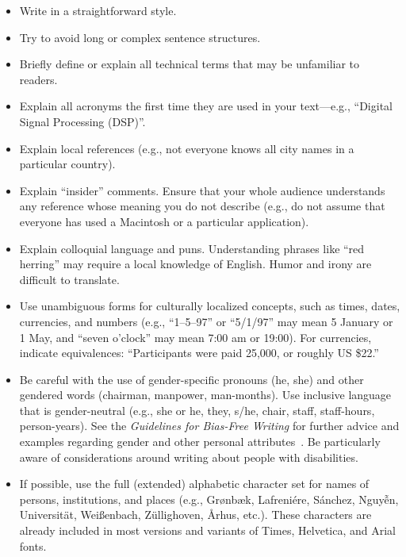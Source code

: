 \documentclass{sigchi}
\begin{document}
\begin{itemize}
\item Write in a straightforward style.
\item Try to avoid long or complex sentence structures.
\item Briefly define or explain all technical terms that may be
  unfamiliar to readers.
\item Explain all acronyms the first time they are used in your
  text---e.g., ``Digital Signal Processing (DSP)''.
\item Explain local references (e.g., not everyone knows all city
  names in a particular country).
\item Explain ``insider'' comments. Ensure that your whole audience
  understands any reference whose meaning you do not describe (e.g.,
  do not assume that everyone has used a Macintosh or a particular
  application).
\item Explain colloquial language and puns. Understanding phrases like
  ``red herring'' may require a local knowledge of English.  Humor and
  irony are difficult to translate.
\item Use unambiguous forms for culturally localized concepts, such as
  times, dates, currencies, and numbers (e.g., ``1--5--97'' or
  ``5/1/97'' may mean 5 January or 1 May, and ``seven o'clock'' may
  mean 7:00 am or 19:00). For currencies, indicate equivalences:
  ``Participants were paid {\selectfont \textwon}
  25,000, or roughly US \$22.''
\item Be careful with the use of gender-specific pronouns (he, she)
  and other gendered words (chairman, manpower, man-months). Use
  inclusive language that is gender-neutral (e.g., she or he, they,
  s/he, chair, staff, staff-hours, person-years). See the
  \textit{Guidelines for Bias-Free Writing} for further advice and
  examples regarding gender and other personal
  attributes~\cite{Schwartz:1995:GBF}. Be particularly aware of
  considerations around writing about people with disabilities.
\item If possible, use the full (extended) alphabetic character set
  for names of persons, institutions, and places (e.g.,
  Gr{\o}nb{\ae}k, Lafreni\'ere, S\'anchez, Nguy\~{\^{e}}n,
  Universit{\"a}t, Wei{\ss}enbach, Z{\"u}llighoven, \r{A}rhus, etc.).
  These characters are already included in most versions and variants
  of Times, Helvetica, and Arial fonts.
\end{itemize}
\end{document}
